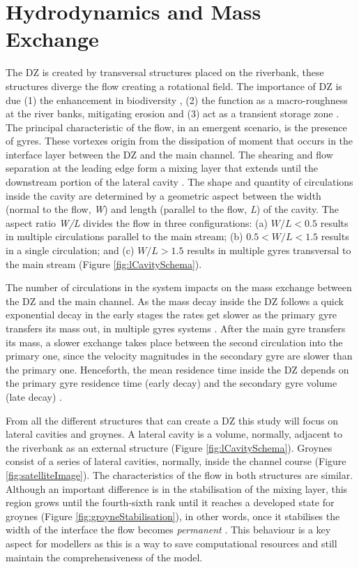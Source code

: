 \section{Hydrodynamics and Mass Exchange}
The DZ is created by transversal structures placed on the riverbank, these structures diverge the flow creating a rotational field. The importance of DZ is due (1) the enhancement in biodiversity \cite{ribi2014,harvey2016}, (2) the function as a macro-roughness at the river banks, mitigating erosion \cite{juez2018} and (3) act as a transient storage zone \cite{jackson2013,drost2014,jackson2015}. The principal characteristic of the flow, in an emergent scenario, is the presence of gyres. These vortexes origin from the dissipation of moment that occurs in the interface layer between the DZ and the main channel. The shearing and flow separation at the leading edge form a mixing layer that extends until the downstream portion of the lateral cavity \cite{uijttewaal2005,jackson2013}. The shape and quantity of circulations inside the cavity are determined by a geometric aspect between the width (normal to the flow, \textit{W}) and length (parallel to the flow, \textit{L}) of the cavity. The aspect ratio \textit{W/L} divides the flow in three configurations: (a) $W/L<0.5$ results in multiple circulations parallel to the main stream; (b) $0.5<W/L<1.5$ results in a single circulation; and (c) $W/L>1.5$ results in multiple gyres transversal to the main stream \cite{weitbrecht2001,jackson2013,sukhodolov2014}(Figure \ref{fig:lCavitySchema}).

The number of circulations in the system impacts on the mass exchange between the DZ and the main channel. As the mass decay inside the DZ follows a quick exponential decay in the early stages the rates get slower as the primary gyre transfers its mass out, in multiple gyres systems \cite{jackson2012,deOliveira2020}. After the main gyre transfers its mass, a slower exchange takes place between the second circulation into the primary one, since the velocity magnitudes in the secondary gyre are slower than the primary one. Henceforth, the mean residence time inside the DZ depends on the primary gyre residence time (early decay) and the secondary gyre volume (late decay) \cite{jackson2013,deOliveira2020}.

From all the different structures that can create a DZ this study will focus on lateral cavities and groynes. A lateral cavity is a volume, normally, adjacent to the riverbank as an external structure (Figure \ref{fig:lCavitySchema}). Groynes consist of a series of lateral cavities, normally, inside the channel course (Figure \ref{fig:satelliteImage}). The characteristics of the flow in both structures are similar. Although an important difference is in the stabilisation of the mixing layer, this region grows until the fourth-sixth rank until it reaches a developed state for groynes (Figure \ref{fig:groyneStabilisation}), in other words, once it stabilises the width of the interface the flow becomes \textit{permanent} \cite{weitbrecht2004, mcCoy2008, xiang2020}. This behaviour is a key aspect for modellers as this is a way to save computational resources and still maintain the comprehensiveness of the model.

